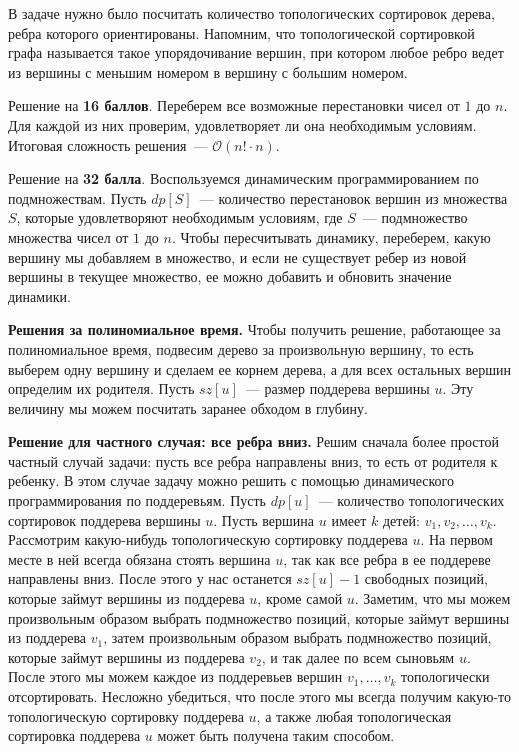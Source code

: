 В задаче нужно было посчитать количество топологических сортировок дерева, ребра которого ориентированы. Напомним, что топологической сортировкой графа называется такое упорядочивание вершин, при котором любое ребро ведет из вершины с меньшим номером в вершину с большим номером.

Решение на \textbf{16 баллов}. Переберем все возможные перестановки чисел от $1$ до $n$. Для каждой из них проверим, удовлетворяет ли она необходимым условиям. Итоговая сложность решения~--- $\mathcal{O}(n! \cdot n)$.

Решение на \textbf{32 балла}. Воспользуемся динамическим программированием по подмножествам. Пусть $dp[S]$~--- количество перестановок вершин из множества $S$, которые удовлетворяют необходимым условиям, где $S$~--- подмножество множества чисел от $1$ до $n$. Чтобы пересчитывать динамику, переберем, какую вершину мы добавляем в множество, и если не существует ребер из новой вершины в текущее множество, ее можно добавить и обновить значение динамики.

\textbf{Решения за полиномиальное время.}
Чтобы получить решение, работающее за полиномиальное время, подвесим дерево за произвольную вершину, то есть выберем одну вершину и сделаем ее корнем дерева, а для всех остальных вершин определим их родителя. Пусть $sz[u]$~--- размер поддерева вершины $u$. Эту величину мы можем посчитать заранее обходом в глубину.

\textbf{Решение для частного случая: все ребра вниз.}
Решим сначала более простой частный случай задачи: пусть все ребра направлены вниз, то есть от родителя к ребенку. В этом случае задачу можно решить с помощью динамического программирования по поддеревьям. Пусть $dp[u]$~--- количество топологических сортировок поддерева вершины $u$. Пусть вершина $u$ имеет $k$ детей: $v_1, v_2, \ldots, v_k$. Рассмотрим какую-нибудь топологическую сортировку поддерева $u$. На первом месте в ней всегда обязана стоять вершина $u$, так как все ребра в ее поддереве направлены вниз. После этого у нас останется $sz[u] - 1$ свободных позиций, которые займут вершины из поддерева $u$, кроме самой $u$. Заметим, что мы можем произвольным образом выбрать подмножество позиций, которые займут вершины из поддерева $v_1$, затем произвольным образом выбрать подмножество позиций, которые займут вершины из поддерева $v_2$, и так далее по всем сыновьям $u$. После этого мы можем каждое из поддеревьев вершин $v_1, \ldots, v_k$ топологически отсортировать. Несложно убедиться, что после этого мы всегда получим какую-то топологическую сортировку поддерева $u$, а также любая топологическая сортировка поддерева $u$ может быть получена таким способом.

